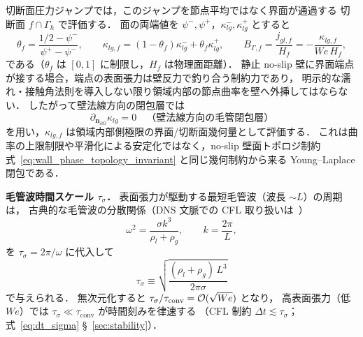 切断面圧力ジャンプでは，このジャンプを節点平均ではなく界面が通過する
切断面 $f\cap\Gamma_h$ で評価する．
面の両端値を $\psi^-,\psi^+$，$\kappa^-_{lg},\kappa^+_{lg}$ とすると
\begin{equation}
  \theta_f =
  \frac{1/2-\psi^-}{\psi^+-\psi^-},\qquad
  \kappa_{lg,f}=(1-\theta_f)\kappa^-_{lg}+\theta_f\kappa^+_{lg},
  \qquad
  B_{\Gamma,f}=\frac{j_{gl,f}}{H_f}
  =-\frac{\kappa_{lg,f}}{We\,H_f},
  \label{eq:cut_face_young_laplace_jump}
\end{equation}
である（$\theta_f$ は $[0,1]$ に制限し，$H_f$ は物理面距離）．
静止 no-slip 壁に界面端点が接する場合，端点の表面張力は壁反力で釣り合う制約力であり，
明示的な濡れ・接触角法則を導入しない限り領域内部の節点曲率を壁へ外挿してはならない．
したがって壁法線方向の閉包層では
\begin{equation}
  \partial_{\bm n_{\partial\Omega}}\kappa_{lg}=0
  \quad\text{（壁法線方向の毛管閉包層）}
  \label{eq:wall_capillary_curvature_closure}
\end{equation}
を用い，$\kappa_{lg,f}$ は領域内部側極限の界面/切断面幾何量として評価する．
これは曲率の上限制限や平滑化による安定化ではなく，no-slip 壁面トポロジ制約
式~\eqref{eq:wall_phase_topology_invariant} と同じ幾何制約から来る Young--Laplace 閉包である．

\noindent\textbf{毛管波時間スケール $\tau_\sigma$．}
表面張力が駆動する最短毛管波（波長 $\sim L$）の周期は，
古典的な毛管波の分散関係（DNS 文脈での CFL 取り扱いは~\cite{DennerVanWachem2015}）
\begin{equation}
  \omega^2 = \frac{\sigma k^3}{\rho_l+\rho_g}, \qquad k = \frac{2\pi}{L},
  \label{eq:capillary_dispersion}
\end{equation}
を $\tau_\sigma = 2\pi/\omega$ に代入して
\begin{equation}
  \tau_\sigma \equiv \sqrt{\frac{(\rho_l+\rho_g)\,L^3}{2\pi\sigma}}
  \label{eq:tau_sigma_def}
\end{equation}
で与えられる．
無次元化すると $\tau_\sigma/\tau_\mathrm{conv} = \mathcal{O}(\sqrt{We})$ となり，
高表面張力（低 $We$）では $\tau_\sigma \ll \tau_\mathrm{conv}$ が時間刻みを律速する
（CFL 制約 $\Delta t \lesssim \tau_\sigma$；式~\eqref{eq:dt_sigma} §~\ref{sec:stability}）．


